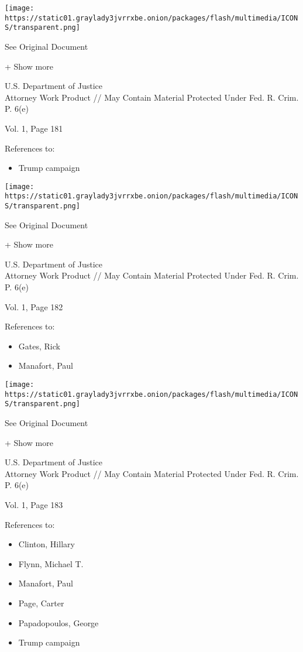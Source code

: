 \protect\hyperlink{}{}

\texttt{[image: https://static01.graylady3jvrrxbe.onion/packages/flash/multimedia/ICONS/transparent.png]}

See Original Document

+ Show more

U.S. Department of Justice\\
Attorney Work Product // May Contain Material Protected Under Fed. R.
Crim. P. 6(e)

Vol. 1, Page 181

References to:

\begin{itemize}
\tightlist
\item
  Trump campaign
\end{itemize}

\protect\hyperlink{}{}

\texttt{[image: https://static01.graylady3jvrrxbe.onion/packages/flash/multimedia/ICONS/transparent.png]}

See Original Document

+ Show more

U.S. Department of Justice\\
Attorney Work Product // May Contain Material Protected Under Fed. R.
Crim. P. 6(e)

Vol. 1, Page 182

References to:

\begin{itemize}
\tightlist
\item
  Gates, Rick
\item
  Manafort, Paul 
\end{itemize}

\protect\hyperlink{}{}

\texttt{[image: https://static01.graylady3jvrrxbe.onion/packages/flash/multimedia/ICONS/transparent.png]}

See Original Document

+ Show more

U.S. Department of Justice\\
Attorney Work Product // May Contain Material Protected Under Fed. R.
Crim. P. 6(e)

Vol. 1, Page 183

References to:

\begin{itemize}
\tightlist
\item
  Clinton, Hillary
\item
  Flynn, Michael T.
\item
  Manafort, Paul 
\item
  Page, Carter
\item
  Papadopoulos, George
\item
  Trump campaign
\end{itemize}

